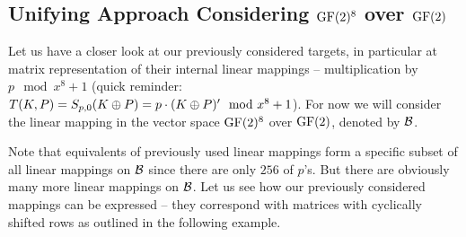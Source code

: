 
\subsection{Unifying Approach Considering $\mathrm{GF}(2)^8$ over $\mathrm{GF}(2)$}

Let us have a closer look at our previously considered targets, in particular at matrix representation of their internal linear mappings -- multiplication by $p\mod{x^8+1}$ (quick reminder: $T(K,P) = S_{p,0}(K\oplus P) = p \cdot (K\oplus P)' \mod{x^8+1}$). For now we will consider the linear mapping in the vector space $\mathrm{GF}(2)^8$ over $\mathrm{GF}(2)$, denoted by $\cal B$.

Note that equivalents of previously used linear mappings form a specific subset of all linear mappings on $\cal B$ since there are only $256$ of $p$'s. But there are obviously many more linear mappings on $\cal B$. Let us see how our previously considered mappings can be expressed -- they correspond with matrices with cyclically shifted rows as outlined in the following example.

\newpage   %

